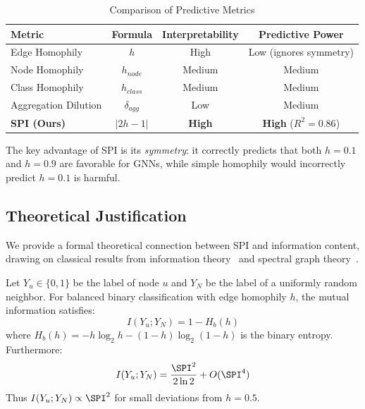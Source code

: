 \begin{table}[t]
\centering
\caption{Comparison of Predictive Metrics}
\label{tab:metric_comparison}
\begin{tabular}{@{}lccc@{}}
\toprule
Metric & Formula & Interpretability & Predictive Power \\
\midrule
Edge Homophily & $h$ & High & Low (ignores symmetry) \\
Node Homophily & $h_{node}$ & Medium & Medium \\
Class Homophily & $h_{class}$ & Medium & Medium \\
Aggregation Dilution & $\delta_{agg}$ & Low & Medium \\
\textbf{SPI (Ours)} & $|2h-1|$ & \textbf{High} & \textbf{High} ($R^2=0.86$) \\
\bottomrule
\end{tabular}
\end{table}

The key advantage of SPI is its \textit{symmetry}: it correctly predicts that both $h=0.1$ and $h=0.9$ are favorable for GNNs, while simple homophily would incorrectly predict $h=0.1$ is harmful.

\subsection{Theoretical Justification}
\label{sec:spi_theory}

We provide a formal theoretical connection between SPI and information content, drawing on classical results from information theory~\cite{cover2006elements} and spectral graph theory~\cite{chung1997spectral}.

\begin{theorem}
\label{thm:spi_mutual_info}
Let $Y_u \in \{0, 1\}$ be the label of node $u$ and $Y_N$ be the label of a uniformly random neighbor. For balanced binary classification with edge homophily $h$, the mutual information satisfies:
\begin{equation}
    I(Y_u; Y_N) = 1 - H_b(h)
\end{equation}
where $H_b(h) = -h\log_2 h - (1-h)\log_2(1-h)$ is the binary entropy. Furthermore:
\begin{equation}
    I(Y_u; Y_N) = \frac{\SPI^2}{2\ln 2} + O(\SPI^4)
\end{equation}
Thus $I(Y_u; Y_N) \propto \SPI^2$ for small deviations from $h = 0.5$.
\end{theorem}

